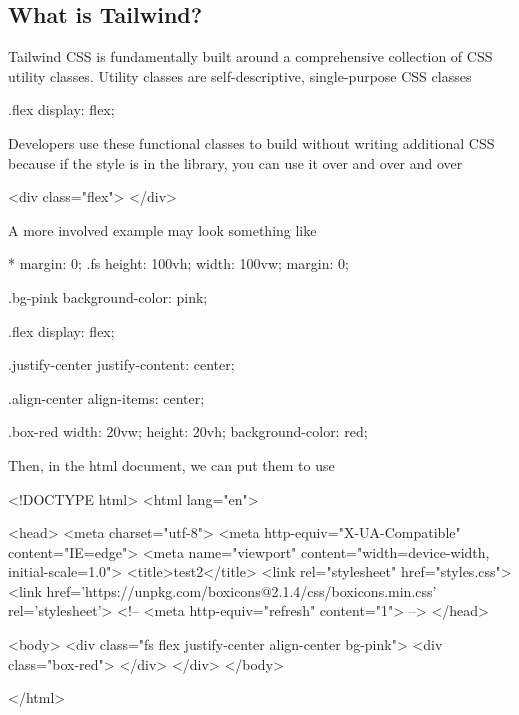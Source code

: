 \documentclass{report}
\begin{document}
    \subsection{What is Tailwind?}
    \bigbreak \noindent 
    Tailwind CSS is fundamentally built around a comprehensive collection of CSS utility classes.
    \bigbreak \noindent 
    Utility classes are self-descriptive, single-purpose CSS classes
    \bigbreak \noindent 
    \begin{cppcode}
        .flex {
            display: flex;
        }
    \end{cppcode}
    \bigbreak \noindent 
    Developers use these functional classes to build without writing additional CSS because if the style is in the library, you can use it over and over and over
    \bigbreak \noindent 
    \begin{htmlcode}
    <div class="flex"> </div>
    \end{htmlcode}
    \bigbreak \noindent 
    A more involved example may look something like
    \bigbreak \noindent 
    \begin{csscode}
        * {
            margin: 0;
        }
        .fs {
            height: 100vh;
            width: 100vw;
            margin: 0;
        }

        .bg-pink {
            background-color: pink;
        }

        .flex {
            display: flex;
        }

        .justify-center {
            justify-content: center;
        }

        .align-center {
            align-items: center;
        }

        .box-red {
            width: 20vw;
            height: 20vh;
            background-color: red;
        }
    \end{csscode}
    \bigbreak \noindent 
    Then, in the html document, we can put them to use
    \bigbreak \noindent 
    \begin{htmlcode}
    <!DOCTYPE html>
    <html lang="en">

    <head>
        <meta charset="utf-8">
        <meta http-equiv="X-UA-Compatible" content="IE=edge">
        <meta name="viewport" content="width=device-width, initial-scale=1.0">
        <title>test2</title>
        <link rel="stylesheet" href="styles.css">
        <link href='https://unpkg.com/boxicons@2.1.4/css/boxicons.min.css' rel='stylesheet'>
        <!-- <meta http-equiv="refresh" content="1"> -->
    </head>

    <body>
        <div class="fs flex justify-center align-center bg-pink"> 
            <div class="box-red"> </div>
        </div>
    </body>

    </html>
    \end{htmlcode}
    \bigbreak \noindent 
\end{document}

